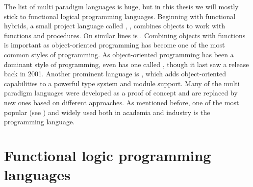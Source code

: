 \documentclass[thesis-solanki.tex]{subfiles}
\begin{document}
The list of multi paradigm languages is huge, but in this thesis we will mostly stick to functional logical
programming languages. Beginning with functional hybrids, a small project language called , 
\cite{website:virgil}, combines objects to work with functions and procedures.
On similar lines is  \cite{website:closwiki}.
Combining objects with functions is important as object-oriented programming has become one of the most common styles of programming.
As object-oriented programming has been a dominant style of programming, even  has one called 
\cite{website:ohaskell},
though it last saw a release back in 2001.
Another prominent language is 
\cite{website:ocamlwiki,website:ocamllang},
which adds object-oriented capabilities to a powerful type system and module support. Many of the multi paradigm languages 
were developed as a proof of concept and are replaced by 
new ones based on different approaches.
As mentioned before, one of the most popular (see \cite{website:langpop}) and widely used both in academia and industry is
the  \cite{website:scala} programming language.


\section{Functional logic programming languages}
\end{document}
